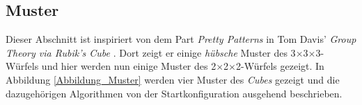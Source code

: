 \documentclass[12pt,a4paper, usenames, dvipsnames]{article}
\theoremstyle{mystyle}
\theoremstyle{definition}
\newcommand{\Ttwo}{2$\times$2$\times$2-}
\newcommand{\Tthree}{3$\times$3$\times$3-}
\begin{document}
%
%
%
%
%
%
%
%
%
%
%
%
%
%
%
%
%
%
%
\subsection{Muster}

Dieser Abschnitt ist inspiriert von dem Part \textit{Pretty Patterns} in Tom Davis' \textit{Group Theory via Rubik's Cube} \cite{TD}.
Dort zeigt er einige \textit{hübsche} Muster des \Tthree Würfels und hier werden nun einige Muster des \Ttwo Würfels gezeigt.
In Abbildung \ref{Abbildung_Muster} werden vier Muster des \textit{Cubes} gezeigt und die dazugehörigen Algorithmen von der Startkonfiguration ausgehend beschrieben.

\begin{figure}[h]
\centering
\begin{tabular}{cc}

\end{tabular}
\end{figure}
\end{document}
